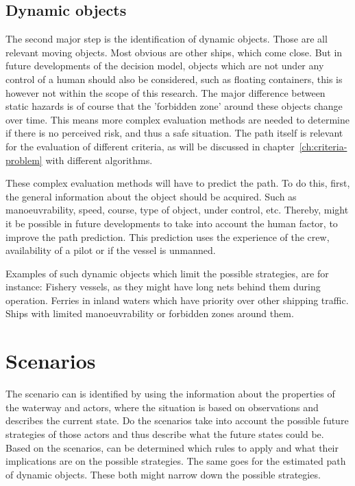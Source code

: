 \subsection{Dynamic objects}
The second major step is the identification of dynamic objects. Those are all relevant moving objects. Most obvious are other ships, which come close. But in future developments of the decision model, objects which are not under any control of a human should also be considered, such as floating containers, this is however not within the scope of this research. The major difference between static hazards is of course that the 'forbidden zone' around these objects change over time. This means more complex evaluation methods are needed to determine if there is no perceived risk, and thus a safe situation. The path itself is relevant for the evaluation of different criteria, as will be discussed in chapter~\ref{ch:criteria-problem} with different algorithms.

These complex evaluation methods will have to predict the path. To do this, first, the general information about the object should be acquired. Such as manoeuvrability, speed, course, type of object, under control, etc.
Thereby, might it be possible in future developments to take into account the human factor, to improve the path prediction. This prediction uses the experience of the crew, availability of a pilot or if the vessel is unmanned.

Examples of such dynamic objects which limit the possible strategies, are for instance: Fishery vessels, as they might have long nets behind them during operation. Ferries in inland waters which have priority over other shipping traffic. Ships with limited manoeuvrability or forbidden zones around them.

\section{Scenarios}
The scenario can is identified by using the information about the properties of the waterway and actors, where the situation is based on observations and describes the current state. Do the scenarios take into account the possible future strategies of those actors and thus describe what the future states could be.
Based on the scenarios, can be determined which rules to apply and what their implications are on the possible strategies. The same goes for the estimated path of dynamic objects. These both might narrow down the possible strategies.

